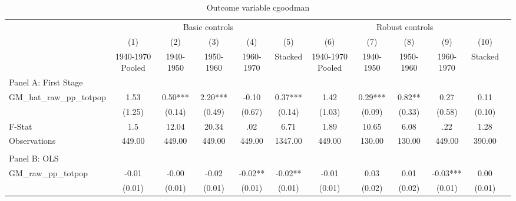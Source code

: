 \begin{table}[htbp]\centering {} \begin{threeparttable} \caption{Outcome variable cgoodman } \begin{tabular}{l*{11}{c}} \toprule
          &\multicolumn{5}{c}{Basic controls}                                   &\multicolumn{5}{c}{Robust controls}                                  \\\cmidrule(lr){2-6}\cmidrule(lr){7-11}
          &\multicolumn{1}{c}{(1)}&\multicolumn{1}{c}{(2)}&\multicolumn{1}{c}{(3)}&\multicolumn{1}{c}{(4)}&\multicolumn{1}{c}{(5)}&\multicolumn{1}{c}{(6)}&\multicolumn{1}{c}{(7)}&\multicolumn{1}{c}{(8)}&\multicolumn{1}{c}{(9)}&\multicolumn{1}{c}{(10)}\\
          &\multicolumn{1}{c}{1940-1970 Pooled}&\multicolumn{1}{c}{1940-1950}&\multicolumn{1}{c}{1950-1960}&\multicolumn{1}{c}{1960-1970}&\multicolumn{1}{c}{Stacked}&\multicolumn{1}{c}{1940-1970 Pooled}&\multicolumn{1}{c}{1940-1950}&\multicolumn{1}{c}{1950-1960}&\multicolumn{1}{c}{1960-1970}&\multicolumn{1}{c}{Stacked}\\
\cmidrule(lr){1-11}
\multicolumn{10}{l}{Panel A: First Stage}\\
\cmidrule(lr){1-11}
GM\_hat\_raw\_pp\_totpop&      1.53   &      0.50***&      2.20***&     -0.10   &      0.37***&      1.42   &      0.29***&      0.82** &      0.27   &      0.11   \\
          &    (1.25)   &    (0.14)   &    (0.49)   &    (0.67)   &    (0.14)   &    (1.03)   &    (0.09)   &    (0.33)   &    (0.58)   &    (0.10)   \\
\midrule
F-Stat    &       1.5   &     12.04   &     20.34   &       .02   &      6.71   &      1.89   &     10.65   &      6.08   &       .22   &      1.28   \\
Observations&    449.00   &    449.00   &    449.00   &    449.00   &   1347.00   &    449.00   &    130.00   &    130.00   &    449.00   &    390.00   \\
\cmidrule[\heavyrulewidth](lr){1-11} \\ \cmidrule[\heavyrulewidth](lr){1-11}
\multicolumn{10}{l}{Panel B: OLS}\\
\cmidrule(lr){1-11}
GM\_raw\_pp\_totpop&     -0.01   &     -0.00   &     -0.02   &     -0.02** &     -0.02** &     -0.01   &      0.03   &      0.01   &     -0.03***&      0.00   \\
          &    (0.01)   &    (0.01)   &    (0.01)   &    (0.01)   &    (0.01)   &    (0.01)   &    (0.02)   &    (0.02)   &    (0.01)   &    (0.01)   \\

\end{tabular}
\end{threeparttable}
\end{table}
